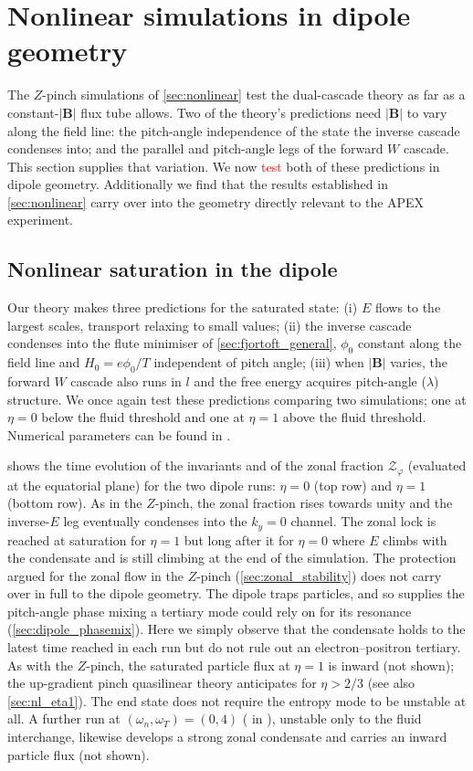 \documentclass{jpp}
\newcommand{\bB}{\mathbf{B}}
\newcommand{\circled}[1]{\tikz[baseline=(char.base)]{\node[shape=circle,draw,inner sep=1.2pt,line width=0.4pt] (char) {\footnotesize #1};}}
\begin{document}
\section{Nonlinear simulations in dipole geometry}\label{sec:dipole}
The $Z$-pinch simulations of \cref{sec:nonlinear} test the dual-cascade theory as far as a constant-$|\bB|$ flux tube allows. Two of the theory's predictions need $|\bB|$ to vary along the field line: the pitch-angle independence of the state the inverse cascade condenses into; and the parallel and pitch-angle legs of the forward $W$ cascade. This section supplies that variation. We now \textcolor{red}{test} both of these predictions in dipole geometry. Additionally we find that the results established in \cref{sec:nonlinear} carry over into the geometry directly relevant to the APEX experiment.

\subsection{Nonlinear saturation in the dipole}\label{sec:dipole_nl}

Our theory makes three predictions for the saturated state: (i) $E$ flows to the largest scales, transport relaxing to small values; (ii) the inverse cascade condenses into the flute minimiser of \cref{sec:fjortoft_general}, $\phi_0$ constant along the field line and $H_0 = e\phi_0/T$ independent of pitch angle; (iii) when $|\bB|$ varies, the forward $W$ cascade also runs in $l$ and the free energy acquires pitch-angle ($\lambda$) structure. We once again test these predictions comparing two simulations; one at $\eta = 0$ below the fluid threshold and one at $\eta = 1$ above the fluid threshold. Numerical parameters can be found in .


 shows the time evolution of the invariants and of the zonal fraction $\mathcal{Z}_\varphi$ (evaluated at the equatorial plane) for the two dipole runs: $\eta = 0$ (top row) and $\eta = 1$ (bottom row). As in the $Z$-pinch, the zonal fraction rises towards unity and the inverse-$E$ leg eventually condenses into the $k_y = 0$ channel. The zonal lock is reached at saturation for $\eta = 1$ but long after it for $\eta = 0$ where $E$ climbs with the condensate and is still climbing at the end of the simulation. The protection argued for the zonal flow in the $Z$-pinch (\cref{sec:zonal_stability}) does not carry over in full to the dipole geometry. The dipole traps particles, and so supplies the pitch-angle phase mixing a tertiary mode could rely on for its resonance (\cref{sec:dipole_phasemix}). Here we simply observe that the condensate holds to the latest time reached in each run but do not rule out an electron--positron tertiary. As with the $Z$-pinch, the saturated particle flux at $\eta = 1$ is inward (not shown); the up-gradient pinch quasilinear theory anticipates for $\eta > 2/3$ \citep{HelanderConnor2016} (see also \cref{sec:nl_eta1}). The end state does not require the entropy mode to be unstable at all. A further run at $(\omega_n, \omega_T) = (0, 4)$ (\circled{E} in ), unstable only to the fluid interchange, likewise develops a strong zonal condensate and carries an inward particle flux (not shown).
\end{document}

